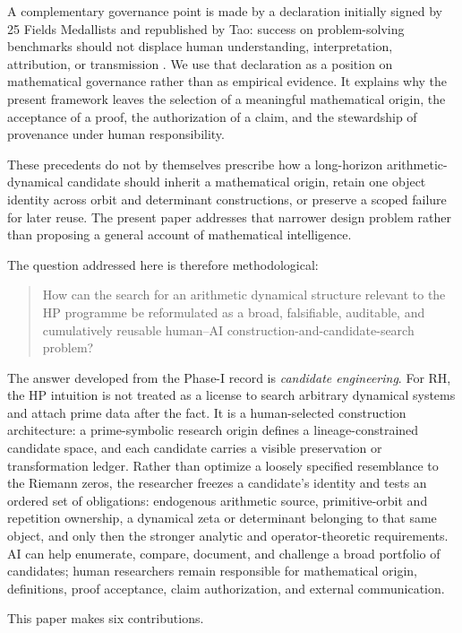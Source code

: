 A complementary governance point is made by a declaration initially signed by
25 Fields Medallists and republished by Tao: success on problem-solving
benchmarks should not displace human understanding, interpretation, attribution,
or transmission \citep{Tao2026Misalignment}. We use that declaration as a
position on mathematical governance rather than as empirical evidence. It
explains why the present framework leaves the selection of a meaningful
mathematical origin, the acceptance of a proof, the authorization of a claim,
and the stewardship of provenance under human responsibility.

These precedents do not by themselves prescribe how a long-horizon
arithmetic-dynamical candidate should inherit a mathematical origin, retain one
object identity across orbit and determinant constructions, or preserve a
scoped failure for later reuse. The present paper addresses that narrower
design problem rather than proposing a general account of mathematical
intelligence.

The question addressed here is therefore methodological:

\begin{quote}
\small How can the search for an arithmetic dynamical structure relevant to
the HP programme be reformulated as a broad, falsifiable, auditable, and
cumulatively reusable human--AI construction-and-candidate-search problem?
\end{quote}

The answer developed from the Phase-I record is \emph{candidate engineering}.
For RH, the HP intuition is not treated as a license to search arbitrary
dynamical systems and attach prime data after the fact. It is a human-selected
construction architecture: a prime-symbolic research origin defines a
lineage-constrained candidate space, and each candidate carries a visible
preservation or transformation ledger. Rather than optimize a loosely specified
resemblance to the Riemann zeros, the researcher freezes a candidate's identity
and tests an ordered set of obligations: endogenous arithmetic source,
primitive-orbit and repetition ownership, a dynamical zeta or determinant
belonging to that same object, and only then the stronger analytic and
operator-theoretic requirements. AI can help enumerate, compare, document, and
challenge a broad portfolio of candidates; human researchers remain responsible
for mathematical origin, definitions, proof acceptance, claim authorization,
and external communication.

This paper makes six contributions.


